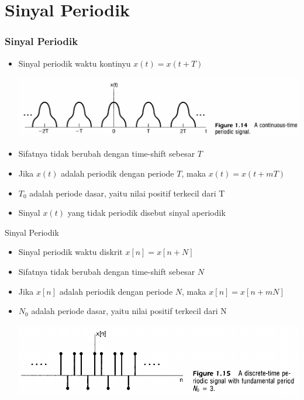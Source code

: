 \documentclass[pdflatex,compress,mathserif]{beamer}
\begin{document}
\section{Sinyal Periodik}

\begin{frame}
	\frametitle{Sinyal Periodik}
	\begin{itemize}
		\item Sinyal periodik waktu kontinyu $ x(t) = x(t + T) $
		\begin{center}
			\includegraphics[width=\linewidth]{img/img26}
		\end{center}
		\item Sifatnya tidak berubah dengan time-shift sebesar $ T $
		\item Jika $ x(t) $ adalah periodik dengan periode $ T $, maka $ x(t) = x(t + mT) $
		\item $ T_0 $ adalah periode dasar, yaitu nilai positif terkecil dari T
		\item Sinyal $ x(t) $ yang tidak periodik disebut sinyal aperiodik
	\end{itemize}
\end{frame}

\begin{frame}{Sinyal Periodik}
	\begin{itemize}
		\item Sinyal periodik waktu diskrit $ x[n] = x[n + N] $
		\item Sifatnya tidak berubah dengan time-shift sebesar $ N $
		\item Jika $ x[n] $ adalah periodik dengan periode $ N $, maka $ x[n] = x[n+mN] $
		\item $ N_0 $ adalah periode dasar, yaitu nilai positif terkecil dari N
		\begin{center}
			\includegraphics[width=\linewidth]{img/img27}
		\end{center}
	\end{itemize}
\end{frame}
\end{document}
